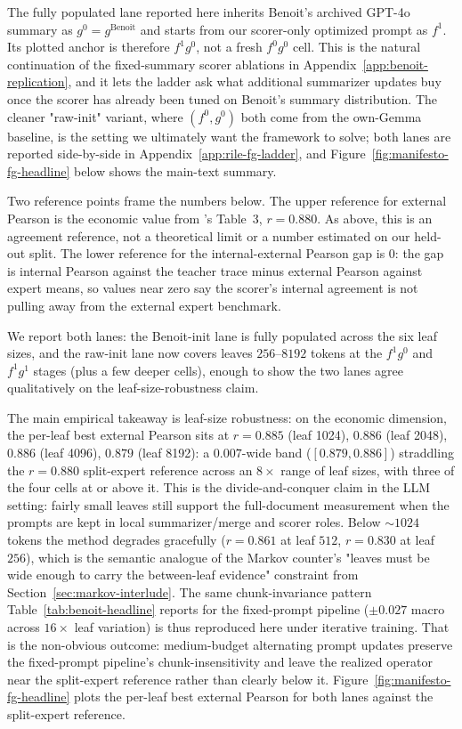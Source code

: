 The fully populated lane reported here inherits Benoit's archived
GPT-4o summary as $g^0 = g^{\mathrm{Benoit}}$ and starts from our
scorer-only optimized prompt as $f^1$. Its plotted anchor is therefore
$f^1 g^0$, not a fresh $f^0 g^0$ cell. This is the natural continuation
of the fixed-summary scorer ablations in Appendix~\ref{app:benoit-replication},
and it lets the ladder ask what additional summarizer updates buy once
the scorer has already been tuned on Benoit's summary distribution. The
cleaner "raw-init" variant, where $(f^0, g^0)$ both come from the
own-Gemma baseline, is the setting we ultimately want the framework to
solve; both lanes are reported side-by-side in
Appendix~\ref{app:rile-fg-ladder}, and
Figure~\ref{fig:manifesto-fg-headline} below shows the main-text summary.

Two reference points frame the numbers below. The upper reference for
external Pearson is the economic value from \citet{BenoitEtAl2025}'s
Table~3, $r = 0.880$. As above, this is an agreement reference, not a
theoretical limit or a number estimated on our held-out split. The
lower reference for the
internal-external Pearson gap is $0$: the gap is internal Pearson
against the teacher trace minus external Pearson against expert means,
so values near zero say the scorer's internal agreement is not pulling
away from the external expert benchmark.

We report both lanes: the Benoit-init lane is fully populated across
the six leaf sizes, and the raw-init lane now covers leaves
$256$--$8192$ tokens at the $f^1 g^0$ and $f^1 g^1$ stages (plus a few
deeper cells), enough to show the two lanes agree qualitatively on
the leaf-size-robustness claim.

The main empirical takeaway is leaf-size robustness: on the economic
dimension, the per-leaf best external Pearson sits at $r = 0.885$
(leaf 1024), $0.886$ (leaf 2048), $0.886$ (leaf 4096), $0.879$ (leaf
8192): a $0.007$-wide band ($[0.879, 0.886]$) straddling the
$r = 0.880$ split-expert reference across an $8\times$ range of
leaf sizes, with three of the four cells at or above it. This is the
divide-and-conquer claim in the LLM setting: fairly small leaves still
support the full-document measurement when the prompts are kept in
local summarizer/merge and scorer roles.
Below $\sim 1024$ tokens the method degrades gracefully
($r = 0.861$ at leaf $512$, $r = 0.830$ at leaf $256$), which is the
semantic analogue of the Markov counter's "leaves must be wide enough
to carry the between-leaf evidence" constraint from
Section~\ref{sec:markov-interlude}. The same chunk-invariance pattern
Table~\ref{tab:benoit-headline} reports for the fixed-prompt pipeline
($\pm 0.027$ macro across $16\times$ leaf variation) is thus
reproduced here under iterative training. That is the non-obvious
outcome: medium-budget alternating prompt updates preserve the
fixed-prompt pipeline's chunk-insensitivity and leave the realized
operator near the split-expert reference rather than clearly below it.
Figure~\ref{fig:manifesto-fg-headline} plots the per-leaf best external
Pearson for both lanes against the split-expert reference.

